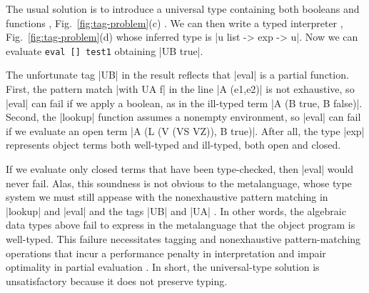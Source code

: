 The usual solution is to introduce a universal type \citep[\S1.3]
{WalidICFP02} containing both booleans and functions%
, Fig.~\ref{fig:tag-problem}(c)%
.
We can then write a typed interpreter%
, Fig.~\ref{fig:tag-problem}(d)
whose inferred type is |u list -> exp -> u|. Now we can evaluate
\texttt{eval [] test1} obtaining |UB true|.
\begin{comment}
\begin{code}
let test1r = eval [] test1
val test1r : u = UB true 
\end{code}
\end{comment}
The unfortunate tag |UB| in the result reflects that |eval| is a partial
function.  
First, the pattern match |with UA f| in the line |A (e1,e2)| is not 
exhaustive, so |eval| can fail if we apply a boolean,
as in the ill-typed term |A (B true, B false)|.
Second, the |lookup|
function assumes a nonempty environment, so |eval| can fail if we
evaluate an open term |A (L (V (VS VZ)), B true)|.
After all, the type |exp| represents object
terms both well-typed and ill-typed, both open and closed.
\begin{comment}
First, the pattern match |with UA f| in the line
|A (e1,e2)| is not exhaustive, so |eval| can fail if we apply a boolean,
as in the ill-typed term |A (B true, B false)|.
\begin{code}
let test2 = A (B true, B false)
let test2r = eval [] test2
Exception: Match_failure in eval
\end{code}
Second, the |lookup|
function assumes a nonempty environment, so |eval| can fail if we
evaluate an open term
\begin{code}
let test3 = A (L (V (VS VZ)), B true)
let test3r = eval [] test3
Exception: Match_failure in lookup
\end{code}
After all, the type |exp| represents object
terms both well-typed and ill-typed, both open and closed.
\end{comment}

If we evaluate only closed terms that have been type-checked, then
|eval| would never fail. Alas, this soundness is not obvious to the
metalanguage, whose type system we must still appease with the
nonexhaustive pattern matching in |lookup| and |eval| and the tags |UB|
and |UA| \cite[\S1.4]{WalidICFP02}.  In other words, the algebraic data
types above fail to express in the metalanguage that the object program
is well-typed.  This failure necessitates tagging and nonexhaustive
pattern\hyp matching operations that incur a performance penalty in
interpretation \cite{WalidICFP02} and impair optimality in partial evaluation
\cite{taha-tag}.  In short, the universal\hyp type solution is
unsatisfactory because it does not preserve typing.

